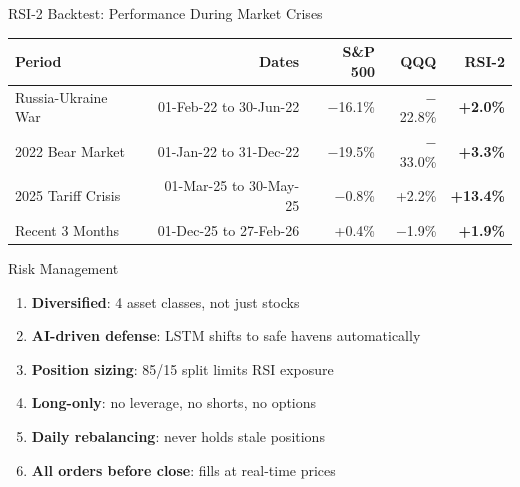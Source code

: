 \documentclass[aspectratio=169]{beamer}
\begin{document}
\begin{frame}{RSI-2 Backtest: Performance During Market Crises}

\begin{table}
\centering
\begin{tabular}{lrrrr}
\toprule
\textbf{Period} & \textbf{Dates} & \textbf{S\&P 500} & \textbf{QQQ} & \textbf{RSI-2} \\
\midrule
Russia-Ukraine War & 01-Feb-22 to 30-Jun-22 & $-$16.1\% & $-$22.8\% & \textbf{+2.0\%} \\
2022 Bear Market & 01-Jan-22 to 31-Dec-22 & $-$19.5\% & $-$33.0\% & \textbf{+3.3\%} \\
2025 Tariff Crisis & 01-Mar-25 to 30-May-25 & $-$0.8\% & +2.2\% & \textbf{+13.4\%} \\
Recent 3 Months & 01-Dec-25 to 27-Feb-26 & +0.4\% & $-$1.9\% & \textbf{+1.9\%} \\
\bottomrule
\end{tabular}
\end{table}

\end{frame}

\begin{frame}{Risk Management}

\Large
\begin{enumerate}
    \item \textbf{Diversified}: 4 asset classes, not just stocks
    \item \textbf{AI-driven defense}: LSTM shifts to safe havens automatically
    \item \textbf{Position sizing}: 85/15 split limits RSI exposure
    \item \textbf{Long-only}: no leverage, no shorts, no options
    \item \textbf{Daily rebalancing}: never holds stale positions
    \item \textbf{All orders before close}: fills at real-time prices
\end{enumerate}

\end{frame}
\end{document}
